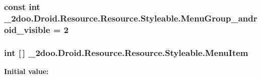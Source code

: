\hypertarget{class__2doo_1_1_droid_1_1_resource_1_1_styleable_c691af6c6099cafd542ab71d20608d25}{
\subsubsection[{MenuGroup\_\-android\_\-visible}]{\setlength{\rightskip}{0pt plus 5cm}const int \_\-2doo.Droid.Resource.Resource.Styleable.MenuGroup\_\-android\_\-visible = 2}}
\label{class__2doo_1_1_droid_1_1_resource_1_1_styleable_c691af6c6099cafd542ab71d20608d25}


\hypertarget{class__2doo_1_1_droid_1_1_resource_1_1_styleable_20b060ccb4e0c6070c73257a461b208a}{
\subsubsection[{MenuItem}]{\setlength{\rightskip}{0pt plus 5cm}int \mbox{[}$\,$\mbox{]} \_\-2doo.Droid.Resource.Resource.Styleable.MenuItem}}
\label{class__2doo_1_1_droid_1_1_resource_1_1_styleable_20b060ccb4e0c6070c73257a461b208a}


\textbf{Initial value:}


